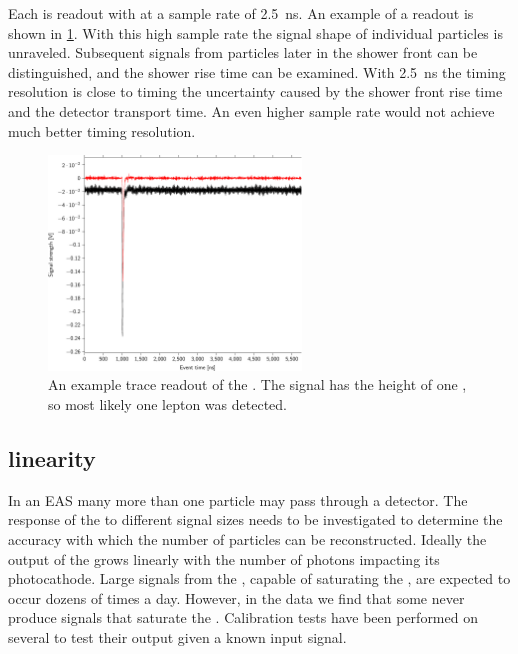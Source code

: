 Each \pmt is readout with \adcs at a sample rate of \SI{2.5}{\ns}. An example of a readout is shown in \cref{fig:trace}. With this high sample rate the signal shape of individual particles is unraveled. Subsequent signals from particles later in the shower front can be distinguished, and the shower rise time can be examined. With \SI{2.5}{\ns} the timing resolution is close to timing the uncertainty caused by the shower front rise time and the detector transport time. An even higher sample rate would not achieve much better timing resolution.

\begin{figure}
    \centering
    \includegraphics[width=0.6\textwidth]
                    {plots/station/trace}
    \caption{An example trace readout of the \pmt. The signal has the height of one \mip, so most likely one lepton was detected.}
    \label{fig:trace}
\end{figure}



\subsection{\pmt linearity}

In an EAS many more than one particle may pass through a detector. The response of the \pmt to different signal sizes needs to be investigated to determine the accuracy with which the number of particles can be reconstructed. Ideally the output of the \pmt grows linearly with the number of photons impacting its photocathode. Large signals from the \pmt, capable of saturating the \adc, are expected to occur dozens of times a day. However, in the data we find that some \pmts never produce signals that saturate the \adc. Calibration tests have been performed on several \pmts to test their output given a known input signal.


